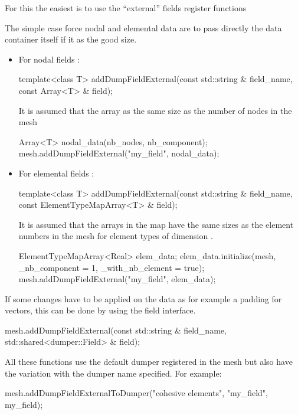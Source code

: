 For this the easiest is to use the ``external'' fields register functions

The simple case force nodal and elemental data are to pass directly the data
container itself if it as the good size.
\begin{itemize}
\item For nodal fields :
\begin{cpp}
  template<class T>
  addDumpFieldExternal(const std::string & field_name,
                       const Array<T> & field);
\end{cpp}

It is assumed that the array as the same size as the number of nodes in the mesh

\begin{cpp}
  Array<T> nodal_data(nb_nodes, nb_component);
  mesh.addDumpFieldExternal("my_field", nodal_data);
\end{cpp}

\item For elemental fields :

\begin{cpp}
  template<class T>
  addDumpFieldExternal(const std::string & field_name,
                       const ElementTypeMapArray<T> & field);
\end{cpp}

It is assumed that the arrays in the map have the same sizes as the element numbers in the mesh for element types of dimension .

\begin{cpp}
  ElementTypeMapArray<Real> elem_data;
  elem_data.initialize(mesh,
                       _nb_component = 1,
                       _with_nb_element = true);
  mesh.addDumpFieldExternal("my_field", elem_data);
\end{cpp}
\end{itemize}

If some changes have to be applied on the data as for example a padding for
 vectors, this can be done by using the
field interface.

\begin{cpp}
  mesh.addDumpFieldExternal(const std::string & field_name,
                             std::shared<dumper::Field> & field);
\end{cpp}

All these functions use the default dumper registered in the mesh but  also have the  variation with the dumper name specified.
For example:
\begin{cpp}
  mesh.addDumpFieldExternalToDumper("cohesive elements",
                                    "my_field",
                                    my_field);
\end{cpp}


